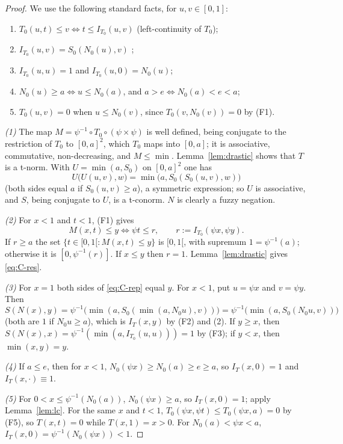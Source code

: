 \documentclass[11pt]{amsart}
\numberwithin{equation}{section}
\theoremstyle{definition}
\theoremstyle{remark}
\newcommand{\Ioc}{[0,1[}
\begin{document}
\begin{proof}
We use the following standard facts, for $u,v\in[0,1]$:
\begin{enumerate}[label=\textup{(F\arabic*)},leftmargin=*,itemsep=2pt]
\item $T_0(u,t)\le v\iff t\le I_{T_0}(u,v)$ (left-continuity of $T_0$);
\item $I_{T_0}(u,v)=S_0(N_0(u),v)$ \cite[Theorem~5.13]{BJ2010};
\item $I_{T_0}(u,u)=1$ and $I_{T_0}(u,0)=N_0(u)$;
\item $N_0(u)\ge a\iff u\le N_0(a)$, and $a>e\iff N_0(a)<e<a$;
\item $T_0(u,v)=0$ when $u\le N_0(v)$, since $T_0(v,N_0(v))=0$ by (F1).
\end{enumerate}

\emph{(1)} The map $M=\psi^{-1}\circ T_0\circ(\psi\times\psi)$ is well
defined, being conjugate to the restriction of $T_0$ to $[0,a]^2$, which $T_0$
maps into $[0,a]$; it is associative, commutative, non-decreasing, and
$M\le\min$. Lemma~\ref{lem:drastic} shows that $T$ is a t-norm. With
$U=\min(a,S_0)$ on $[0,a]^2$ one has
\[
  U\bigl(U(u,v),w\bigr)=\min\bigl(a,S_0(S_0(u,v),w)\bigr)
\]
(both sides equal $a$ if $S_0(u,v)\ge a$), a symmetric expression; so $U$ is
associative, and $S$, being conjugate to $U$, is a t-conorm. $N$ is clearly a
fuzzy negation.

\emph{(2)} For $x<1$ and $t<1$, (F1) gives
\[
  M(x,t)\le y \iff \psi t\le r, \qquad r:=I_{T_0}(\psi x,\psi y).
\]
If $r\ge a$ the set $\{t\in\Ioc : M(x,t)\le y\}$ is $\Ioc$, with supremum
$1=\psi^{-1}(a)$; otherwise it is $[0,\psi^{-1}(r)]$. If $x\le y$ then $r=1$.
Lemma~\ref{lem:drastic} gives \eqref{eq:C-res}.

\emph{(3)} For $x=1$ both sides of \eqref{eq:C-rep} equal $y$. For $x<1$, put
$u=\psi x$ and $v=\psi y$. Then
\[
  S(N(x),y)=\psi^{-1}\bigl(\min(a,S_0(\min(a,N_0u),v))\bigr)
           =\psi^{-1}\bigl(\min(a,S_0(N_0u,v))\bigr)
\]
(both are $1$ if $N_0u\ge a$), which is $I_T(x,y)$ by (F2) and (2). If
$y\ge x$, then $S(N(x),x)=\psi^{-1}(\min(a,I_{T_0}(u,u)))=1$ by (F3); if
$y<x$, then $\min(x,y)=y$.

\emph{(4)} If $a\le e$, then for $x<1$,
$N_0(\psi x)\ge N_0(a)\ge e\ge a$, so $I_T(x,0)=1$ and
$I_T(x,\cdot)\equiv1$.

\emph{(5)} For $0<x\le\psi^{-1}(N_0(a))$, $N_0(\psi x)\ge a$, so
$I_T(x,0)=1$; apply Lemma~\ref{lem:lc}. For the same $x$ and $t<1$,
$T_0(\psi x,\psi t)\le T_0(\psi x,a)=0$ by (F5), so $T(x,t)=0$ while
$T(x,1)=x>0$. For $N_0(a)<\psi x<a$, $I_T(x,0)=\psi^{-1}(N_0(\psi x))<1$.
\end{proof}
\end{document}
